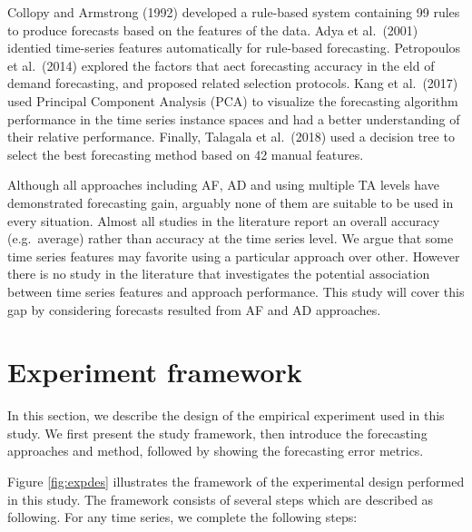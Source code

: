 \documentclass[]{elsarticle} %
\begin{document}
Collopy and Armstrong (1992) developed a rule-based system containing 99
rules to produce forecasts based on the features of the data. Adya et
al.~(2001) identied time-series features automatically for rule-based
forecasting. Petropoulos et al.~(2014) explored the factors that aect
forecasting accuracy in the eld of demand forecasting, and proposed
related selection protocols. Kang et al.~(2017) used Principal Component
Analysis (PCA) to visualize the forecasting algorithm performance in the
time series instance spaces and had a better understanding of their
relative performance. Finally, Talagala et al.~(2018) used a decision
tree to select the best forecasting method based on 42 manual features.

Although all approaches including AF, AD and using multiple TA levels
have demonstrated forecasting gain, arguably none of them are suitable
to be used in every situation. Almost all studies in the literature
report an overall accuracy (e.g.~average) rather than accuracy at the
time series level. We argue that some time series features may favorite
using a particular approach over other. However there is no study in the
literature that investigates the potential association between time
series features and approach performance. This study will cover this gap
by considering forecasts resulted from AF and AD approaches.

\hypertarget{framework}{%
\section{Experiment framework}\label{framework}}

In this section, we describe the design of the empirical experiment used
in this study. We first present the study framework, then introduce the
forecasting approaches and method, followed by showing the forecasting
error metrics.

Figure \ref{fig:expdes} illustrates the framework of the experimental
design performed in this study. The framework consists of several steps
which are described as following. For any time series, we complete the
following steps:
\end{document}

